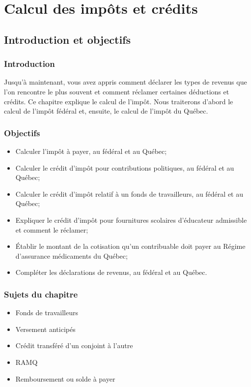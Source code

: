 \chapter{Calcul des impôts et crédits}
\section{Introduction et objectifs}
\subsection{Introduction}
Jusqu'à maintenant, vous avez appris comment déclarer les types de revenus que l'on rencontre le plus souvent et comment réclamer certaines déductions et crédits. Ce chapitre explique le calcul de l'impôt. Nous traiterons d'abord le calcul de l'impôt fédéral et, ensuite, le calcul de l'impôt du Québec.


\subsection{Objectifs}
\begin{itemize}[label=]
	\item Calculer l'impôt à payer, au fédéral et au Québec;
	\item Calculer le crédit d'impôt pour contributions politiques, au fédéral et au Québec;
	\item Calculer le crédit d'impôt relatif à un fonds de travailleurs, au fédéral et au Québec;
	\item Expliquer le crédit d'impôt pour fournitures scolaires d'éducateur admissible et comment le réclamer;
	\item Établir le montant de la cotisation qu'un contribuable doit payer au Régime d'assurance médicaments du Québec;
	\item Compléter les déclarations de revenus, au fédéral et au Québec.
\end{itemize}


\subsection{Sujets du chapitre}
\begin{itemize}
	\item Fonds de travailleurs
	\item Versement anticipés
	\item Crédit transféré d'un conjoint à l'autre
	\item RAMQ
	\item Remboursement ou solde à payer
\end{itemize}



